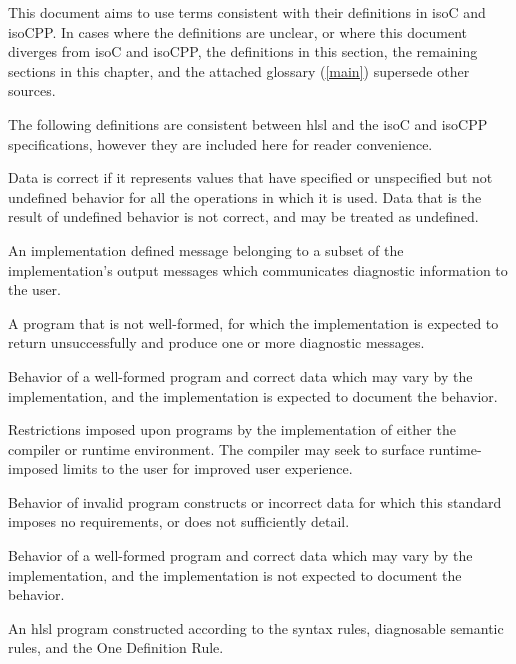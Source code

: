 
\p This document aims to use terms consistent with their definitions in
\gls{isoC} and \gls{isoCPP}. In cases where the definitions are unclear, or
where this document diverges from \gls{isoC} and \gls{isoCPP}, the definitions
in this section, the remaining sections in this chapter, and the attached
glossary (\ref{main}) supersede other sources.


\p The following definitions are consistent between \acrshort{hlsl} and the
\gls{isoC} and \gls{isoCPP} specifications, however they are included here for
reader convenience.

\p Data is correct if it represents values that have specified or unspecified
but not undefined behavior for all the operations in which it is used. Data that
is the result of undefined behavior is not correct, and may be treated as
undefined.

\p An implementation defined message belonging to a subset of the
implementation's output messages which communicates diagnostic information to
the user.

\p A program that is not well-formed, for which the implementation is expected
to return unsuccessfully and produce one or more diagnostic messages.

\p Behavior of a well-formed program and correct data which may vary by the
implementation, and the implementation is expected to document the behavior.

\p Restrictions imposed upon programs by the implementation of either the
compiler or runtime environment. The compiler may seek to surface
runtime-imposed limits to the user for improved user experience.

\p Behavior of invalid program constructs or incorrect data for which this
standard imposes no requirements, or does not sufficiently detail.

\p Behavior of a well-formed program and correct data which may vary by the
implementation, and the implementation is not expected to document the behavior.

\p An \acrshort{hlsl} program constructed according to the syntax rules,
diagnosable semantic rules, and the One Definition Rule.

